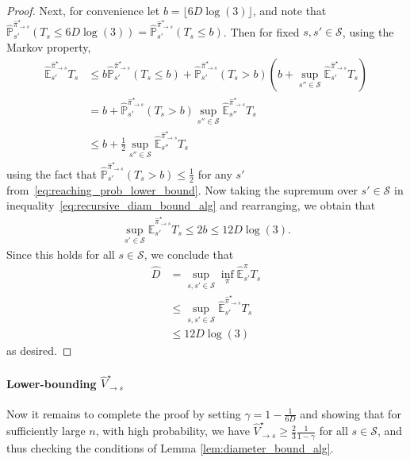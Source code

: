 \documentclass{article}
\theoremstyle{plain}
\theoremstyle{plain}
\theoremstyle{remark}
\theoremstyle{plain}
\theoremstyle{plain}
\renewcommand{\P}{\mathbb{P}}
\newcommand{\Ehat}{\widehat{\mathbb{E}}}
\newcommand{\Vhat}{\widehat{V}}
\newcommand{\pihstar}{\widehat{\pi}^\star}
\renewcommand{\S}{\mathcal{S}}
\begin{document}
\begin{proof}
        Next, for convenience let $b = \lfloor 6 D \log( 3)\rfloor $, and note that $\widehat{\P}_{s'}^{\pihstar_{\to s}}\left(T_{s} \leq 6 D \log( 3)\right) = \widehat{\P}_{s'}^{\pihstar_{\to s}}\left(T_{s} \leq b\right)$. Then for fixed $s,s' \in \S$, using the Markov property,
        \begin{align}
             \Ehat^{\pihstar_{\to s}}_{s'} T_s 
            & \leq  b \widehat{\P}_{s'}^{\pihstar_{\to s}}\left(T_{s} \leq b\right) + \widehat{\P}_{s'}^{\pihstar_{\to s}}\left(T_{s} > b\right)\left(b +\sup_{s'' \in \S} \Ehat^{\pihstar_{\to s}}_{s'} T_s \right) \nonumber \\
            & = b  + \widehat{\P}_{s'}^{\pihstar_{\to s}}\left(T_{s} > b\right) \sup_{s'' \in \S} \Ehat^{\pihstar_{\to s}}_{s''} T_s \nonumber \\
            & \leq b  + \frac{1}{2} \sup_{s'' \in \S} \Ehat^{\pihstar_{\to s}}_{s''} T_s \label{eq:recursive_diam_bound_alg}
        \end{align}
        using the fact that $\widehat{\P}_{s'}^{\pihstar_{\to s}}\left(T_{s} > b\right)  \leq \frac{1}{2}$ for any $s'$ from~\eqref{eq:reaching_prob_lower_bound}. Now taking the supremum over $s' \in \S$ in inequality~\eqref{eq:recursive_diam_bound_alg} and rearranging, we obtain that
        \begin{align*}
            \sup_{s' \in \S} \Ehat^{\pihstar_{\to s}}_{s'} T_s \leq 2b \leq 12 D \log(3).
        \end{align*}
        Since this holds for all $s \in \S$, we conclude that
        \begin{align*}
            \widehat{D} &= \sup_{s, s' \in \S} \inf_{\pi} \Ehat^{\pi}_{s'} T_{s} \\
            & \leq \sup_{s, s' \in \S} \Ehat^{\pihstar_{\to s}}_{s'} T_{s} \\
            & \leq 12 D \log(3)
        \end{align*}
        as desired.
    \end{proof}



\paragraph{Lower-bounding $\Vhat^\star_{\to s}$} 
Now it remains to complete the proof by setting $\gamma = 1 - \frac{1}{6D}$ and showing that for sufficiently large $n$, with high probability, we have $\Vhat^\star_{\to s} \geq \frac{2}{3}\frac{1}{1-\gamma}$ for all $s \in \S$, and thus checking the conditions  of Lemma \ref{lem:diameter_bound_alg}.
\end{document}
